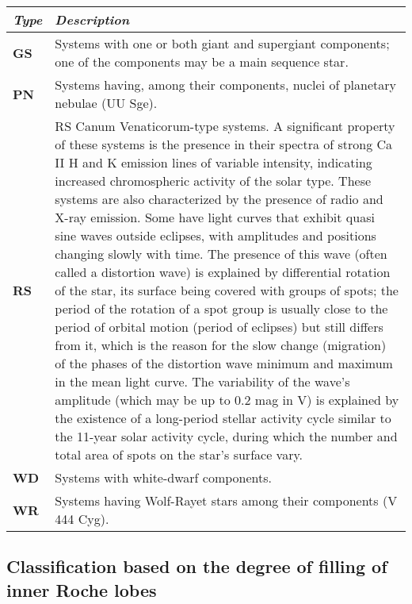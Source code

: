 \begin{longtabu} to \textwidth {l|X}
\toprule
\emph{Type} & \emph{Description}\tabularnewline
\midrule
\textbf{GS} & Systems with one or both giant and supergiant components;
one of the components may be a main sequence star.\tabularnewline
\textbf{PN} & Systems having, among their components, nuclei of
planetary nebulae (UU Sge).\tabularnewline
\textbf{RS} & RS Canum Venaticorum-type systems. A significant property
of these systems is the presence in their spectra of strong Ca II H and
K emission lines of variable intensity, indicating increased
chromospheric activity of the solar type. These systems are also
characterized by the presence of radio and X-ray emission. Some have
light curves that exhibit quasi sine waves outside eclipses, with
amplitudes and positions changing slowly with time. The presence of this
wave (often called a distortion wave) is explained by differential
rotation of the star, its surface being covered with groups of spots;
the period of the rotation of a spot group is usually close to the
period of orbital motion (period of eclipses) but still differs from it,
which is the reason for the slow change (migration) of the phases of the
distortion wave minimum and maximum in the mean light curve. The
variability of the wave's amplitude (which may be up to 0.2 mag in V) is
explained by the existence of a long-period stellar activity cycle
similar to the 11-year solar activity cycle, during which the number and
total area of spots on the star's surface vary.\tabularnewline
\textbf{WD} & Systems with white-dwarf components.\tabularnewline
\textbf{WR} & Systems having Wolf-Rayet stars among their components (V
444 Cyg).\tabularnewline
\bottomrule
\end{longtabu}

\subsection{Classification based on the degree of filling of inner Roche
lobes}\label{classification-based-on-the-degree-of-filling-of-inner-roche-lobes}

